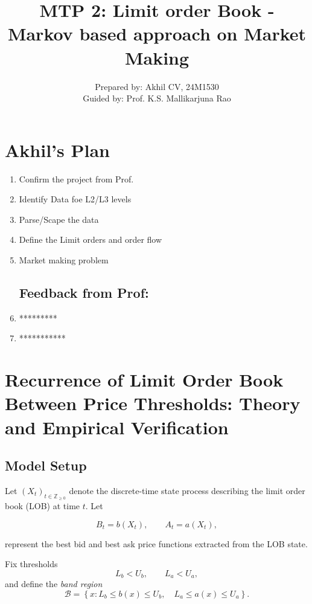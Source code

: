 \documentclass[11pt]{article}
\title{MTP 2: Limit order Book - Markov based approach on Market Making}
\author{Prepared by: Akhil CV, 24M1530 \\
Guided by: Prof. K.S. Mallikarjuna Rao}
\begin{document}
\maketitle

\section{Akhil's Plan }

\begin{enumerate}
\item[\checkmark] Confirm the project from Prof.
\item Identify Data foe L2/L3 levels 
\item Parse/Scape the data
\item Define the Limit orders and order flow
\item Market making problem


\subsection{Feedback from Prof: }
\item *********
\item ***********
\end{enumerate}

\maketitle

\section{Recurrence of Limit Order Book Between Price Thresholds: Theory and Empirical Verification}

\subsection{Model Setup}

Let $(X_t)_{t \in \mathbb{Z}_{\ge 0}}$ denote the discrete-time state process describing the limit order book (LOB) at time $t$.  
Let

\[
B_t = b(X_t), \qquad A_t = a(X_t),
\]

represent the best bid and best ask price functions extracted from the LOB state.

Fix thresholds
\[
L_b < U_b, \qquad L_a < U_a,
\]
and define the \emph{band region}
\[
\mathcal{B} = \left\{ x :  L_b \le b(x) \le U_b,\quad L_a \le a(x) \le U_a \right\}.
\]
\end{document}

